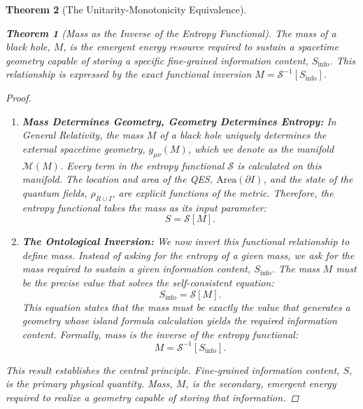 \documentclass[11pt, letterpaper]{report}
\theoremstyle{plain} %
\newtheorem{theorem}{Theorem}[chapter]
\theoremstyle{definition} %
\theoremstyle{remark} %
\begin{document}
\begin{theorem}[The Unitarity-Monotonicity Equivalence]
\begin{theorem}[Mass as the Inverse of the Entropy Functional]
\label{thm:mass_is_inverse_entropy}
The mass of a black hole, $M$, is the emergent energy resource required to sustain a spacetime geometry capable of storing a specific fine-grained information content, $S_{\text{info}}$. This relationship is expressed by the exact functional inversion $M = \mathcal{S}^{-1}[S_{\text{info}}]$.
\end{theorem}
\begin{proof}
\begin{enumerate}
    \item \textbf{Mass Determines Geometry, Geometry Determines Entropy:} In General Relativity, the mass $M$ of a black hole uniquely determines the external spacetime geometry, $g_{\mu\nu}(M)$, which we denote as the manifold $\mathcal{M}(M)$. Every term in the entropy functional $\mathcal{S}$ is calculated on this manifold. The location and area of the QES, $\text{Area}(\partial I)$, and the state of the quantum fields, $\rho_{R \cup I}$, are explicit functions of the metric. Therefore, the entropy functional takes the mass as its input parameter:
    \begin{equation}
        S = \mathcal{S}[M].
    \end{equation}

    \item \textbf{The Ontological Inversion:} We now invert this functional relationship to define mass. Instead of asking for the entropy of a given mass, we ask for the mass required to sustain a given information content, $S_{\text{info}}$. The mass $M$ must be the precise value that solves the self-consistent equation:
    \begin{equation}
        S_{\text{info}} = \mathcal{S}[M].
    \end{equation}
    This equation states that the mass must be exactly the value that generates a geometry whose island formula calculation yields the required information content. Formally, mass is the inverse of the entropy functional:
    \begin{equation}
        M = \mathcal{S}^{-1}[S_{\text{info}}].
    \end{equation}
\end{enumerate}
This result establishes the central principle. Fine-grained information content, $S$, is the primary physical quantity. Mass, $M$, is the secondary, emergent energy required to realize a geometry capable of storing that information.
\end{proof}















\end{theorem}
\end{document}
